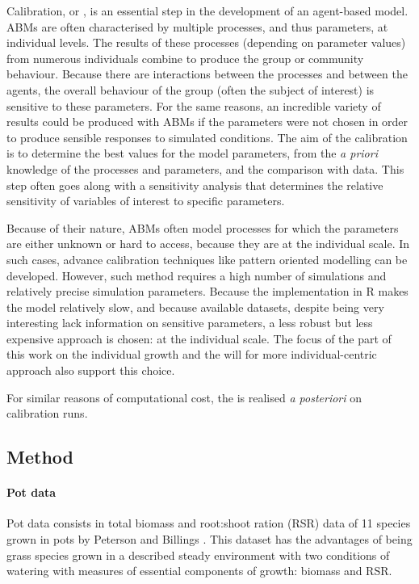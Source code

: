 Calibration, or , is an essential step in the development of an agent-based model. ABMs are often characterised by multiple processes, and thus parameters, at individual levels. The results of these processes (depending on parameter values) from numerous individuals combine to produce the group or community behaviour. Because there are interactions between the processes and between the agents, the overall behaviour of the group (often the subject of interest) is sensitive to these parameters. For the same reasons, an incredible variety of results could be produced with ABMs if the parameters were not chosen in order to produce sensible responses to simulated conditions. The aim of the calibration is to determine the best values for the model parameters, from the \textit{a priori} knowledge of the processes and parameters, and the comparison with data. This step often goes along with a sensitivity analysis that determines the relative sensitivity of variables of interest to specific parameters.

Because of their nature, ABMs often model processes for which the parameters are either unknown or hard to access, because they are at the individual scale. In such cases, advance calibration techniques like pattern oriented modelling \parencite{grimm_pattern-oriented_2005, hartig_statistical_2011} can be developed. However, such method requires a high number of simulations and relatively precise simulation parameters. Because the implementation in R makes the model relatively slow, and because available datasets, despite being very interesting lack information on sensitive parameters, a less robust but less expensive approach is chosen:  at the individual scale. The focus of the part of this work on the individual growth and the will for more individual-centric approach also support this choice.

 For similar reasons of computational cost, the  is  realised \textit{a posteriori} on calibration runs.

\subsection{Method}

\paragraph{Pot data}
Pot data consists in total biomass and root:shoot ration (RSR) data of 11 species grown in pots by Peterson and Billings \parencite{peterson_growth_1982}. This dataset has the advantages of being grass species grown in a described steady environment with two conditions of watering with measures of essential components of growth: biomass and RSR.

